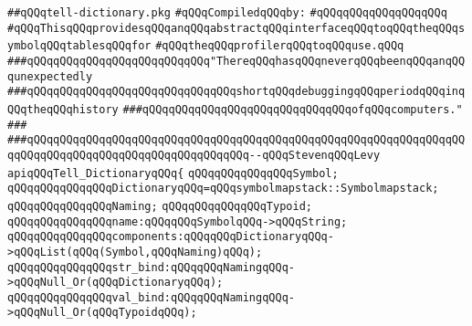 \label{src/lib/compiler/debugging-and-profiling/profiling/tell-env.pkg}
\verb|##qQQqtell-dictionary.pkg|\newline
\newline
\verb|#qQQqCompiledqQQqby:|\newline
\verb|#qQQqqQQqqQQqqQQqqQQq|\newline
\newline
\verb|#qQQqThisqQQqprovidesqQQqanqQQqabstractqQQqinterfaceqQQqtoqQQqtheqQQqsymbolqQQqtablesqQQqfor|\newline
\verb|#qQQqtheqQQqprofilerqQQqtoqQQquse.qQQq|\newline
\newline
\newline
\newline
\verb|###qQQqqQQqqQQqqQQqqQQqqQQqqQQq"ThereqQQqhasqQQqneverqQQqbeenqQQqanqQQqunexpectedly|\newline
\verb|###qQQqqQQqqQQqqQQqqQQqqQQqqQQqqQQqshortqQQqdebuggingqQQqperiodqQQqinqQQqtheqQQqhistory|\newline
\verb|###qQQqqQQqqQQqqQQqqQQqqQQqqQQqqQQqofqQQqcomputers."|\newline
\verb|###|\newline
\verb|###qQQqqQQqqQQqqQQqqQQqqQQqqQQqqQQqqQQqqQQqqQQqqQQqqQQqqQQqqQQqqQQqqQQqqQQqqQQqqQQqqQQqqQQqqQQqqQQqqQQqqQQq--qQQqStevenqQQqLevy|\newline
\newline
\newline
\verb|apiqQQqTell_DictionaryqQQq{|\newline
\newline
\verb|qQQqqQQqqQQqqQQqSymbol;|\newline
\verb|qQQqqQQqqQQqqQQqDictionaryqQQq=qQQqsymbolmapstack::Symbolmapstack;|\newline
\verb|qQQqqQQqqQQqqQQqNaming;|\newline
\verb|qQQqqQQqqQQqqQQqTypoid;|\newline
\verb|qQQqqQQqqQQqqQQqname:qQQqqQQqSymbolqQQq->qQQqString;|\newline
\verb|qQQqqQQqqQQqqQQqcomponents:qQQqqQQqDictionaryqQQq->qQQqList(qQQq(Symbol,qQQqNaming)qQQq);|\newline
\verb|qQQqqQQqqQQqqQQqstr_bind:qQQqqQQqNamingqQQq->qQQqNull_Or(qQQqDictionaryqQQq);|\newline
\verb|qQQqqQQqqQQqqQQqval_bind:qQQqqQQqNamingqQQq->qQQqNull_Or(qQQqTypoidqQQq);|\newline
